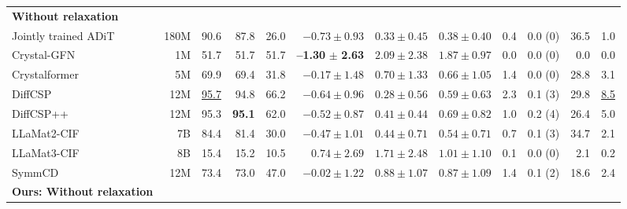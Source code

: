 \documentclass{article}
\theoremstyle{plain}
\theoremstyle{definition}
\theoremstyle{remark}
\begin{document}
\begin{table}[!ht]
{\begin{tabular}{@{}lrrrrrrrrrrr@{}}
    \midrule
    \textbf{Without relaxation} \\
    Jointly trained ADiT          & 180M & 90.6             & 87.8          & 26.0          & $-0.73 \pm 0.93$ & $0.33 \pm 0.45$ & $0.38 \pm 0.40$ & 0.4 & 0.0 (0) & 36.5 & 1.0 \\
    Crystal-GFN & 1M   & 51.7             & 51.7          & 51.7          & \textbf{--1.30} $\pm$ \textbf{2.63} & $2.09 \pm 2.38$ & $1.87 \pm 0.97$ & 0.0 & 0.0 (0) & 0.0 & 0.0 \\
    Crystalformer & 5M & 69.9             & 69.4          & 31.8          & $-0.17 \pm 1.48$ & $0.70 \pm 1.33$ & $0.66 \pm 1.05$ & 1.4 & 0.0 (0) & 28.8 & 3.1 \\
    DiffCSP & 12M       & \underline{95.7} & 94.8          & 66.2          & $-0.64 \pm 0.96$ & $0.28 \pm 0.56$ & $0.59 \pm 0.63$ & 2.3 & 0.1 (3) & 29.8 & \underline{8.5} \\
    DiffCSP++ & 12M     & 95.3             & \textbf{95.1} & 62.0          & $-0.52 \pm 0.87$ & $0.41 \pm 0.44$ & $0.69 \pm 0.82$ & 1.0 & 0.2 (4) & 26.4 & 5.0 \\
    LLaMat2-CIF & 7B   & 84.4             & 81.4          & 30.0          & $-0.47 \pm 1.01$ & $0.44 \pm 0.71$ & $0.54 \pm 0.71$ & 0.7 & 0.1 (3) & 34.7 & 2.1 \\
    LLaMat3-CIF & 8B   & 15.4             & 15.2          & 10.5          & $0.74 \pm 2.69$  & $1.71 \pm 2.48$ & $1.01 \pm 1.10$ & 0.1 & 0.0 (0) & 2.1  & 0.2 \\
    SymmCD & 12M        & 73.4             & 73.0          & 47.0          & $-0.02 \pm 1.22$ & $0.88 \pm 1.07$ & $0.87 \pm 1.09$ & 1.4 & 0.1 (2) & 18.6 & 2.4 \\
    \midrule
    \textbf{Ours: Without relaxation} \\

\end{tabular}}
\end{table}
\end{document}
